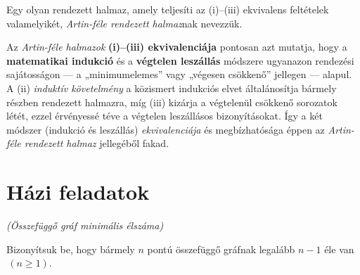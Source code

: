 \begin{rem}
Egy olyan rendezett halmaz, amely teljesíti az (i)--(iii) ekvivalens
feltételek valamelyikét, \emph{Artin-féle rendezett halmaz}nak nevezzük. 
\end{rem}

\begin{rem}
Az \emph{Artin-féle halmazok} \textbf{(i)--(iii) ekvivalenciája}
pontosan azt mutatja, hogy a \textbf{matematikai indukció} és a \textbf{végtelen
leszállás} módszere ugyanazon rendezési sajátosságon --- a „minimumelemes”
vagy „végesen csökkenő” jellegen --- alapul. A (ii) \emph{induktív
követelmény} a közismert indukciós elvet általánosítja bármely részben
rendezett halmazra, míg (iii) kizárja a végtelenül csökkenő sorozatok
létét, ezzel érvényessé téve a végtelen leszállásos bizonyításokat.
Így a két módszer (indukció és leszállás) \emph{ekvivalenciája} és
megbízhatósága éppen az \emph{Artin-féle rendezett halmaz} jellegéből
fakad. 
\end{rem}

\section*{Házi feladatok}
\begin{problem}
\emph{(Összefüggő gráf minimális élszáma)}

Bizonyítsuk be, hogy bármely $n$ pontú összefüggő gráfnak legalább
$n-1$ éle van $\,(n\ge1)$. 
\end{problem}

